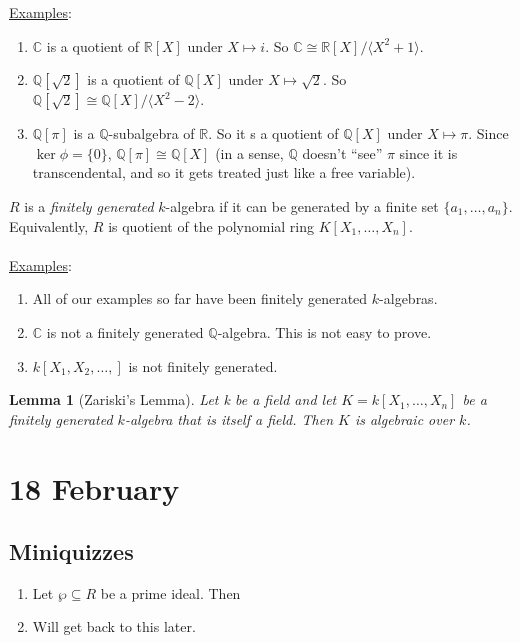 \documentclass[12pt]{article}
\newcommand{\q}{\mathbb{Q}}
\newcommand{\cx}{\mathbb{C}}
\newcommand{\real}{\mathbb{R}}
\newcommand{\ita}[1]{\textit{#1}}
\newcommand{\vbrack}[1]{\langle #1\rangle}
\newtheorem{lemma}[theorem]{Lemma}
\theoremstyle{definition}
\begin{document}
\underline{Examples}: 
\begin{enumerate}
    \item $\cx$ is a quotient of $\real[X]$ under $X\mapsto i$. So $\cx\cong\real[X]/\vbrack{X^2+1}$.
    \item $\q[\sqrt{2}]$ is a quotient of $\q[X]$ under $X\mapsto\sqrt{2}$. So $\q[\sqrt{2}]\cong\q[X]/\vbrack{X^2-2}$.
    \item $\q[\pi]$ is a $\q$-subalgebra of $\real$. So it s a quotient of $\q[X]$ under $X\mapsto\pi$. Since $\ker\phi=\{0\}$, $\q[\pi]\cong\q[X]$ (in a sense, $\q$ doesn't ``see'' $\pi$ since it is transcendental, and so it gets treated just like a free variable).
\end{enumerate}
$R$ is a \ita{finitely generated} $k$-algebra if it can be generated by a finite set $\{a_1,\dotsc,a_n\}$. Equivalently, $R$ is quotient of the polynomial ring $K[X_1,\dotsc,X_n]$.\\\\
\underline{Examples}:
\begin{enumerate}
    \item All of our examples so far have been finitely generated $k$-algebras.
    \item $\cx$ is not a finitely generated $\q$-algebra. This is not easy to prove.
    \item $k[X_1,X_2,\dotsc,]$ is not finitely generated.
\end{enumerate}
\begin{lemma}[Zariski's Lemma]
    Let k be a field and let $K=k[X_1,\dotsc,X_n]$ be a finitely generated $k$-algebra that is itself a field. Then $K$ is algebraic over $k$.
\end{lemma}
\section{18 February}
\subsection{Miniquizzes}
\begin{enumerate}
    \item Let $\wp\subseteq R$ be a prime ideal. Then 
    \item Will get back to this later.
\end{enumerate}
\end{document}

